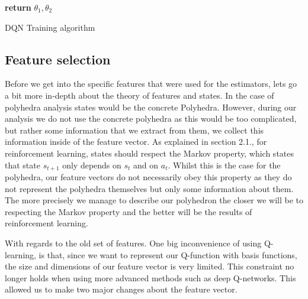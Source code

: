 \begin{center}
\begin{algorithm}[H]
{{     \Indm
     \Indp{}
		\Indm
	\Indp{}\Indm
	\Indp{}
			
    }
    
   }
   \textbf{return} $\theta_1,\theta_2$
    
\caption{DQN Training algorithm}
\end{algorithm}
\end{center}



\subsection{Feature selection}
Before we get into the specific features that were used for the estimators, lets go a bit more in-depth about the theory of features and states. In the case of polyhedra analysis states would be the concrete Polyhedra. However, during our analysis we do not use the concrete polyhedra as this would be too complicated, but rather some information that we extract from them, we collect this information inside of the feature vector. As explained in section 2.1., for reinforcement learning, states should respect the Markov property, which states that state $s_{t+1}$ only depends on $s_t$ and on $a_t$. Whilst this is the case for the polyhedra, our feature vectors do not necessarily obey this property as they do not represent the polyhedra themselves but only some information about them. The more precisely we manage to describe our polyhedron the closer we will be to respecting the Markov property and the better will be the results of reinforcement learning. 

With regards to the old set of features. One big inconvenience of using Q-learning, is that, since we want to represent our Q-function with basis functions, the size and dimensions of our feature vector is very limited. This constraint no longer holds when using more advanced methods such as deep Q-networks. This allowed us to make two major changes about the feature vector. 
